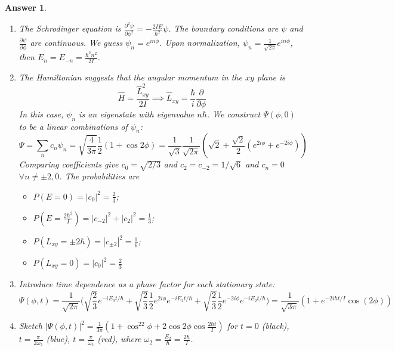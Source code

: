 \documentclass[a4paper]{article}
\newtheorem{ans}{Answer}[subsection]
\theoremstyle{new}
\begin{document}
\begin{ans}\leavevmode
\begin{enumerate}[label=(\alph*)]
\item The Schrodinger equation is $\frac{\partial^2\psi}{\partial\phi^2}=-\frac{2IE}{\hbar^2}\psi$. The boundary conditions are $\psi$ and $\frac{\partial\psi}{\partial\phi}$ are continuous. We guess $\psi_n=e^{in\phi}$. Upon normalization, $\psi_n=\frac{1}{\sqrt{2\pi}}e^{in\phi}$, then $E_n=E_{-n}=\frac{\hbar^2n^2}{2I}$.
\item The Hamiltonian suggests that the angular momentum in the $xy$ plane is
$$\hat{H}=\frac{\hat{L}_{xy}^2}{2I}\implies\hat{L}_{xy}=\frac{\hbar}{i}\frac{\partial}{\partial\phi}$$
In this case, $\psi_n$ is an eigenstate with eigenvalue $n\hbar$. We construct $\Psi(\phi,0)$ to be a linear combinations of $\psi_n$:
$$\Psi=\sum_nc_n\psi_n=\sqrt{\frac{4}{3\pi}}\frac{1}{2}(1+\cos2\phi)=\frac{1}{\sqrt{3}}\frac{1}{\sqrt{2\pi}}(\sqrt{2}+\frac{\sqrt{2}}{2}(e^{2i\phi}+e^{-2i\phi}))$$
Comparing coefficients give $c_0=\sqrt{2/3}$ and $c_2=c_{-2}=1/\sqrt{6}$ and $c_n=0$ $\forall n\neq\pm2,0$. The probabilities are
\begin{itemize}
    \item $P(E=0)=|c_0|^2=\frac{2}{3}$;
    \item $P(E=\frac{2\hbar^2}{I})=|c_{-2}|^2+|c_2|^2=\frac{1}{3}$;
    \item $P(L_{xy}=\pm2\hbar)=|c_{\pm2}|^2=\frac{1}{6}$;
    \item $P(L_{xy}=0)=|c_0|^2=\frac{2}{3}$
\end{itemize}
\item Introduce time dependence as a phase factor for each stationary state:
$$\Psi(\phi,t)=\frac{1}{\sqrt{2\pi}}\bigg(\sqrt{\frac{2}{3}}e^{-iE_0t/\hbar}+\sqrt{\frac{2}{3}}\frac{1}{2}e^{2i\phi}e^{-iE_2t/\hbar}+\sqrt{\frac{2}{3}}\frac{1}{2}e^{-2i\phi}e^{-iE_2t/\hbar}\bigg)=\frac{1}{\sqrt{3\pi}}(1+e^{-2i\hbar t/I}\cos(2\phi))$$
\item Sketch $|\Psi(\phi,t)|^2=\frac{1}{3\pi}(1+\cos^22\phi+2\cos2\phi\cos\frac{2\hbar t}{I})$ for $t=0$ (black), $t=\frac{\pi}{2\omega_2}$ (blue), $t=\frac{\pi}{\omega_2}$ (red), where $\omega_2=\frac{E_2}{\hbar}=\frac{2\hbar}{I}$.
\begin{center}
\end{center}
\end{enumerate}
\end{ans}
\end{document}
